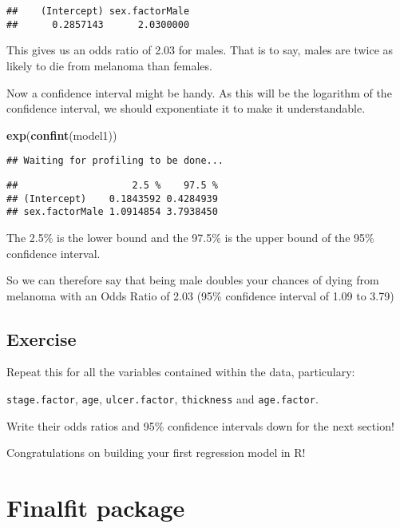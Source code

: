 \documentclass[]{book}
\makeatletter
\newenvironment{Shaded}{\begin{snugshade}}{\end{snugshade}}
\newcommand{\KeywordTok}[1]{\textcolor[rgb]{0.13,0.29,0.53}{\textbf{#1}}}
\newcommand{\NormalTok}[1]{#1}
\newenvironment{kframe}{%
\medskip{}
\setlength{\fboxsep}{.8em}
 \def\at@end@of@kframe{}%
 \ifinner\ifhmode%
  \def\at@end@of@kframe{\end{minipage}}%
  \begin{minipage}{\columnwidth}%
 \fi\fi%
 \def\FrameCommand##1{\hskip\@totalleftmargin \hskip-\fboxsep
 \colorbox{shadecolor}{##1}\hskip-\fboxsep
     \hskip-\linewidth \hskip-\@totalleftmargin \hskip\columnwidth}%
 \MakeFramed {\advance\hsize-\width
   \@totalleftmargin\z@ \linewidth\hsize
   \@setminipage}}%
 {\par\unskip\endMakeFramed%
 \at@end@of@kframe}
\renewenvironment{Shaded}{\begin{kframe}}{\end{kframe}}
\theoremstyle{definition}
\theoremstyle{definition}
\theoremstyle{definition}
\theoremstyle{remark}
\makeatother
\begin{document}
\begin{verbatim}
##    (Intercept) sex.factorMale 
##      0.2857143      2.0300000
\end{verbatim}

This gives us an odds ratio of 2.03 for males. That is to say, males are
twice as likely to die from melanoma than females.

Now a confidence interval might be handy. As this will be the logarithm
of the confidence interval, we should exponentiate it to make it
understandable.

\begin{Shaded}
\begin{Highlighting}[]
\KeywordTok{exp}\NormalTok{(}\KeywordTok{confint}\NormalTok{(model1))}
\end{Highlighting}
\end{Shaded}

\begin{verbatim}
## Waiting for profiling to be done...
\end{verbatim}

\begin{verbatim}
##                    2.5 %    97.5 %
## (Intercept)    0.1843592 0.4284939
## sex.factorMale 1.0914854 3.7938450
\end{verbatim}

The 2.5\% is the lower bound and the 97.5\% is the upper bound of the
95\% confidence interval.

So we can therefore say that being male doubles your chances of dying
from melanoma with an Odds Ratio of 2.03 (95\% confidence interval of
1.09 to 3.79)

\subsection{Exercise}\label{exercise-44}

Repeat this for all the variables contained within the data,
particulary:

\texttt{stage.factor}, \texttt{age}, \texttt{ulcer.factor},
\texttt{thickness} and \texttt{age.factor}.

Write their odds ratios and 95\% confidence intervals down for the next
section!

Congratulations on building your first regression model in R!

\section{Finalfit package}\label{finalfit-package}
\end{document}
